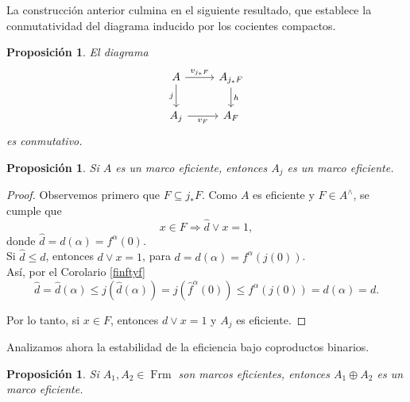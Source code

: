 \documentclass[11pt]{amsart}
\DeclareMathOperator{\Frm}{Frm}
\theoremstyle{plain}
\newtheorem{prop}[thm]{Proposición}
\theoremstyle{definition}
\begin{document}
La construcción anterior culmina en el siguiente resultado, que establece la conmutatividad del diagrama inducido por los cocientes compactos.
\begin{prop}\label{VFsquare}
El diagrama
\begin{equation}\label{Cuadrado}
    \begin{tikzcd}
	A & {A_{j_*F}} \\
	{A_j} & {A_F}
	\arrow["{v_{j_*F}}", from=1-1, to=1-2]
	\arrow["j"', from=1-1, to=2-1]
	\arrow["h", from=1-2, to=2-2]
	\arrow["{v_F}"', from=2-1, to=2-2]
\end{tikzcd}\end{equation}
es conmutativo.
\end{prop}

\begin{prop}\label{tidyquout}
    Si $A$ es un marco eficiente, entonces $A_j$ es un marco eficiente.
\end{prop}

\begin{proof}
Observemos primero que $F\subseteq j_*F$. Como $A$ es eficiente y $F\in A^\wedge$, se cumple que 
\[
x\in F\Rightarrow \hat{d}\vee x=1,
\]
donde $\hat{d}=d(\alpha)=f^\alpha(0)$.\\

Si $\hat{d}\leq d$, entonces $d\vee x=1$, para $d=d(\alpha)=f^\alpha(j(0))$.\\

Así, por el Corolario \ref{finftyf}
\[
\hat{d}=\hat{d}(\alpha)\leq j(\hat{d}(\alpha))=j(\hat{f}^\alpha(0))\leq f^\alpha(j(0))=d(\alpha)=d.
\]

Por lo tanto, si $x\in F$, entonces $d\vee x=1$ y $A_j$ es eficiente.
\end{proof}

Analizamos ahora la estabilidad de la eficiencia bajo coproductos binarios.
\begin{prop}\label{tidyplus}
Si $A_1, A_2\in \Frm$ son marcos eficientes, entonces $A_1\oplus A_2$ es un marco eficiente.
\end{prop}
\end{document}

